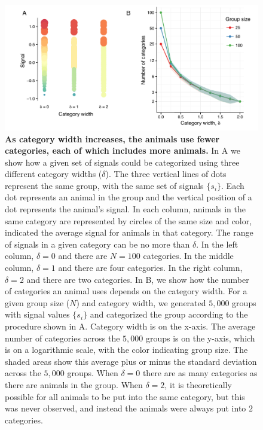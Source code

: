 \newpage



\newpage

\begin{figure}[ht]
\includegraphics[width=6.85in]{figures/category_diagram.pdf}
\caption{\sffamily\small\textbf{As category width increases, the animals use fewer categories, each of which includes more animals.} 
In A we show how a given set of signals could be categorized using three different category widths ($\delta$). The three vertical lines of dots represent the same group, with the same set of signals $\{s_i\}$. Each dot represents an animal in the group and the vertical position of a dot represents the animal's signal. In each column, animals in the same category are represented by circles of the same size and color, indicated the average signal for animals in that category. The range of signals in a given category can be no more than $\delta$. In the left column, $\delta=0$ and there are $N=100$ categories. In the middle column, $\delta=1$ and there are four categories. In the right column, $\delta=2$ and there are two categories.  In B, we show how the number of categories an animal uses depends on the category width. For a given group size ($N$) and category width, we generated $5,000$ groups with signal values $\{s_i\}$ and categorized the group according to the procedure shown in A.  Category width is on the x-axis. The average number of categories across the $5,000$ groups is on the y-axis, which is on a logarithmic scale, with the color indicating group size. The shaded areas show this average plus or minus the standard deviation across the $5,000$ groups. When $\delta=0$ there are as many categories as there are animals in the group. When $\delta=2$, it is theoretically possible for all animals to be put into the same category, but this was never observed, and instead the animals were always put into $2$ categories. }
 \label{category_diagram}
\end{figure}

